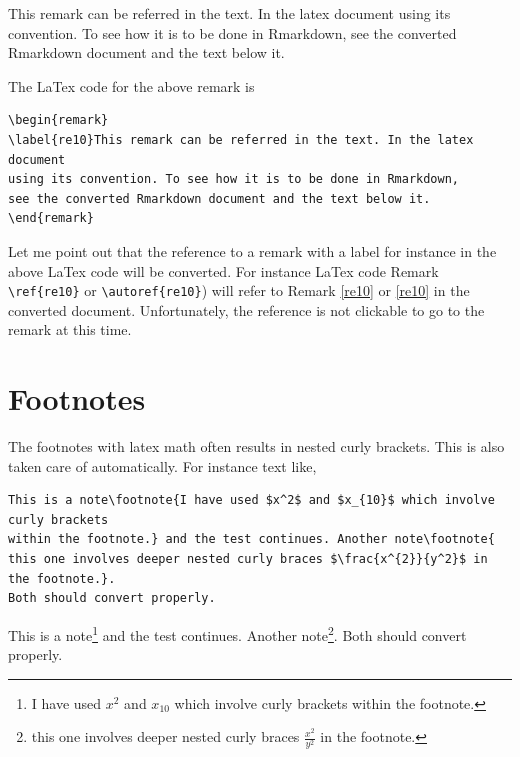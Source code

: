 \documentclass[12pt,svgnames]{article}
\begin{document}
\begin{remark}
\label{re10}This remark can be referred in the text. In the latex document using its convention. 
To see how it is to be done in Rmarkdown, see the converted Rmarkdown document and the text below it.
\end{remark}

The LaTex code for the above remark is
\begin{verbatim}
\begin{remark}
\label{re10}This remark can be referred in the text. In the latex document 
using its convention. To see how it is to be done in Rmarkdown, 
see the converted Rmarkdown document and the text below it.
\end{remark}
\end{verbatim}
Let me point out that the reference to a remark with a label for instance in the above LaTex code will be converted. 
For instance LaTex code Remark \verb&\ref{re10}& or \verb&\autoref{re10}&) will refer to Remark \ref{re10} or \autoref{re10} in the converted document. Unfortunately, the reference is not clickable to go to the remark at this time.

\section{Footnotes} \label{sec9}
The footnotes with latex math often results in nested curly brackets. This is also taken care of automatically.  For instance text like,

\begin{verbatim}
This is a note\footnote{I have used $x^2$ and $x_{10}$ which involve curly brackets 
within the footnote.} and the test continues. Another note\footnote{
this one involves deeper nested curly braces $\frac{x^{2}}{y^2}$ in the footnote.}. 
Both should convert properly.
\end{verbatim}

This is a note\footnote{I have used $x^2$ and $x_{10}$ which involve curly brackets 
within the footnote.} and the test continues. Another note\footnote{
this one involves deeper nested curly braces $\frac{x^{2}}{y^2}$ in the footnote.}. 
Both should convert properly.

\printbibliography
\end{document}
